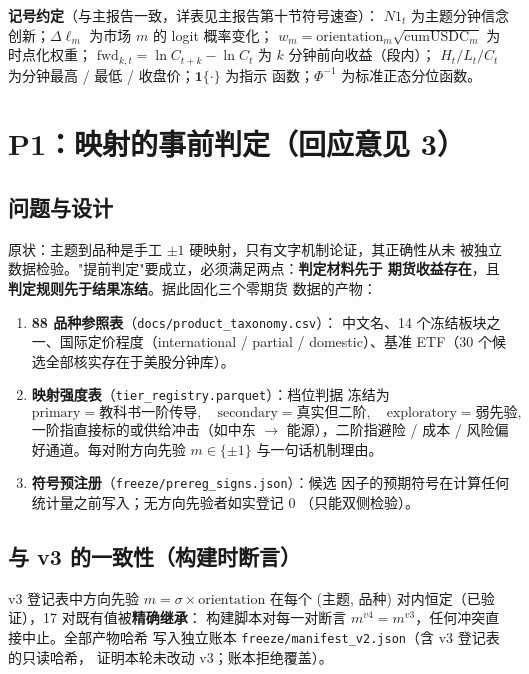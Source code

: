 \documentclass[11pt, a4paper]{ctexart}
\newcommand{\code}[1]{\texttt{\small #1}}
\begin{document}
\noindent\textbf{记号约定}（与主报告一致，详表见主报告第十节符号速查）：
$N1_t$ 为主题分钟信念创新；$\Delta\ell_m$ 为市场 $m$ 的 logit 概率变化；
$w_m=\mathrm{orientation}_m\sqrt{\mathrm{cumUSDC}_m}$ 为时点化权重；
$\mathrm{fwd}_{k,t}=\ln C_{t+k}-\ln C_t$ 为 $k$ 分钟前向收益（段内）；
$H_t/L_t/C_t$ 为分钟最高 / 最低 / 收盘价；$\mathbf{1}\{\cdot\}$ 为指示
函数；$\Phi^{-1}$ 为标准正态分位函数。

\section{P1：映射的事前判定（回应意见 3）}\label{sec:p1}

\subsection{问题与设计}

原状：主题到品种是手工 $\pm1$ 硬映射，只有文字机制论证，其正确性从未
被独立数据检验。"提前判定"要成立，必须满足两点：\textbf{判定材料先于
期货收益存在}，且\textbf{判定规则先于结果冻结}。据此固化三个零期货
数据的产物：

\begin{enumerate}
\item \textbf{88 品种参照表}（\code{docs/product\_taxonomy.csv}）：
  中文名、14 个冻结板块之一、国际定价程度（international / partial /
  domestic）、基准 ETF（30 个候选全部核实存在于美股分钟库）。
\item \textbf{映射强度表}（\code{tier\_registry.parquet}）：档位判据
  冻结为
  \[
  \text{primary} = \text{教科书一阶传导},\quad
  \text{secondary} = \text{真实但二阶},\quad
  \text{exploratory} = \text{弱先验},
  \]
  一阶指直接标的或供给冲击（如中东 $\to$ 能源），二阶指避险 / 成本 /
  风险偏好通道。每对附方向先验 $m\in\{\pm1\}$ 与一句话机制理由。
\item \textbf{符号预注册}（\code{freeze/prereg\_signs.json}）：候选
  因子的预期符号在计算任何统计量之前写入；无方向先验者如实登记 0
  （只能双侧检验）。
\end{enumerate}

\subsection{与 v3 的一致性（构建时断言）}

v3 登记表中方向先验 $m=\sigma\times\mathrm{orientation}$ 在每个
(主题, 品种) 对内恒定（已验证），17 对既有值被\textbf{精确继承}：
构建脚本对每一对断言 $m^{v4}=m^{v3}$，任何冲突直接中止。全部产物哈希
写入独立账本 \code{freeze/manifest\_v2.json}（含 v3 登记表的只读哈希，
证明本轮未改动 v3；账本拒绝覆盖）。
\end{document}
